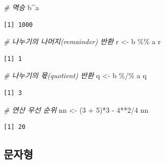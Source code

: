 \documentclass[
  11pt,
]{krantz}
\newenvironment{Shaded}{\begin{snugshade}}{\end{snugshade}}
\newcommand{\CommentTok}[1]{\textcolor[rgb]{0.37,0.37,0.37}{\textit{#1}}}
\newcommand{\DecValTok}[1]{\textcolor[rgb]{0.06,0.06,0.06}{#1}}
\newcommand{\NormalTok}[1]{#1}
\newcommand{\OtherTok}[1]{\textcolor[rgb]{0.37,0.37,0.37}{#1}}
\newcommand{\SpecialCharTok}[1]{\textcolor[rgb]{0,0,0}{#1}}
\begin{document}
\begin{Shaded}
\begin{Highlighting}[]
\CommentTok{\# 멱승}
\NormalTok{b}\SpecialCharTok{\^{}}\NormalTok{a}
\end{Highlighting}
\end{Shaded}

\begin{verbatim}
[1] 1000
\end{verbatim}

\begin{Shaded}
\begin{Highlighting}[]
\CommentTok{\# 나누기의 나머지(remainder) 반환}
\NormalTok{r }\OtherTok{\textless{}{-}}\NormalTok{ b }\SpecialCharTok{\%\%}\NormalTok{ a}
\NormalTok{r}
\end{Highlighting}
\end{Shaded}

\begin{verbatim}
[1] 1
\end{verbatim}

\begin{Shaded}
\begin{Highlighting}[]
\CommentTok{\# 나누기의 몫(quotient) 반환}
\NormalTok{q }\OtherTok{\textless{}{-}}\NormalTok{ b }\SpecialCharTok{\%/\%}\NormalTok{ a}
\NormalTok{q}
\end{Highlighting}
\end{Shaded}

\begin{verbatim}
[1] 3
\end{verbatim}

\begin{Shaded}
\begin{Highlighting}[]
\CommentTok{\# 연산 우선 순위}
\NormalTok{nn }\OtherTok{\textless{}{-}}\NormalTok{ (}\DecValTok{3} \SpecialCharTok{+} \DecValTok{5}\NormalTok{)}\SpecialCharTok{*}\DecValTok{3} \SpecialCharTok{{-}} \DecValTok{4}\SpecialCharTok{**}\DecValTok{2}\SpecialCharTok{/}\DecValTok{4}
\NormalTok{nn}
\end{Highlighting}
\end{Shaded}

\begin{verbatim}
[1] 20
\end{verbatim}

\normalsize

\hypertarget{character}{%
\subsection{문자형}\label{character}}
\end{document}
